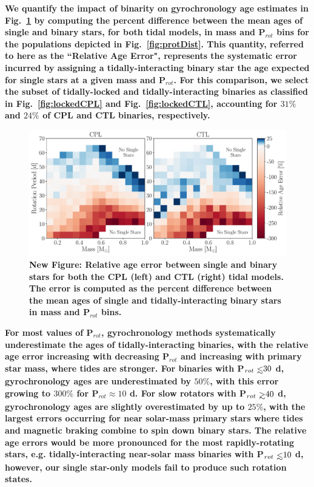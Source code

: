 \documentclass[twocolumn]{aastex61}
\def\gsim{~\rlap{$>$}{\lower 1.0ex\hbox{$\sim$}}}
\def\lsim{~\rlap{$<$}{\lower 1.0ex\hbox{$\sim$}}}
\newcommand{\xxx}[1]{{\textbf{#1}}}
\begin{document}
\xxx{We quantify the impact of binarity on gyrochronology age estimates in Fig.~\ref{fig:gyro} by computing the percent difference between the mean ages of single and binary stars, for both tidal models, in mass and P$_{rot}$ bins for the populations depicted in Fig.~\ref{fig:protDist}. This quantity, referred to here as the ``Relative Age Error", represents the systematic error incurred by assigning a tidally-interacting binary star the age expected for single stars at a given mass and P$_{rot}$. For this comparison, we select the subset of tidally-locked and tidally-interacting binaries as classified in Fig.~\ref{fig:lockedCPL} and Fig.~\ref{fig:lockedCTL}, accounting for $31\%$ and $24\%$ of CPL and CTL binaries, respectively.} 

\begin{figure}[t]
	\includegraphics[width=\textwidth]{../Plots/gyro.pdf}
   \caption{\xxx{New Figure: Relative age error between single and binary stars for both the CPL (left) and CTL (right) tidal models. The error is computed as the percent difference between the mean ages of single and tidally-interacting binary stars in mass and P$_{rot}$ bins.}}%
    \label{fig:gyro}%
\end{figure}

\xxx{For most values of P$_{rot}$, gyrochronology methods systematically underestimate the ages of tidally-interacting binaries, with the relative age error increasing with decreasing P$_{rot}$ and increasing with primary star mass, where tides are stronger. For binaries with P$_{rot} \lsim 30$ d, gyrochronology ages are underestimated by $50\%$, with this error growing to $300\%$ for P$_{rot} \approx 10$ d. For slow rotators with P$_{rot} \gsim 40$ d, gyrochronology ages are slightly overestimated by up to $25\%$, with the largest errors occurring for near solar-mass primary stars where tides and magnetic braking combine to spin down binary stars.  The relative age errors would be more pronounced for the most rapidly-rotating stars, e.g. tidally-interacting near-solar mass binaries with P$_{rot} \lsim 10$ d, however, our single star-only models fail to produce such rotation states.}
\end{document}
